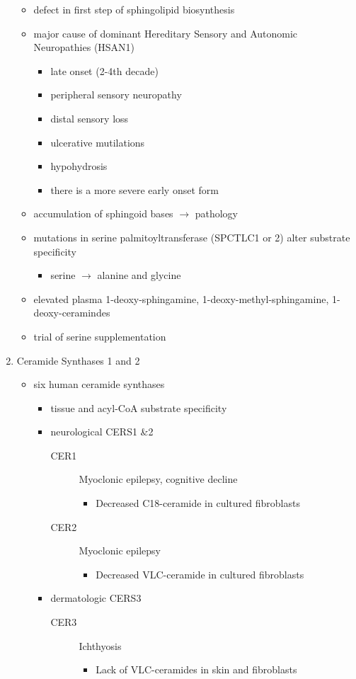 \documentclass{scrartcl}
\begin{document}
\begin{enumerate}
\begin{itemize}
\item defect in first step of sphingolipid biosynthesis
\item major cause of dominant Hereditary Sensory and Autonomic Neuropathies (HSAN1)
\begin{itemize}
\item late onset (2-4th decade)
\item peripheral sensory neuropathy
\item distal sensory loss
\item ulcerative mutilations
\item hypohydrosis
\item there is a more severe early onset form
\end{itemize}
\item accumulation of sphingoid bases \(\to\) pathology
\item mutations in serine palmitoyltransferase (SPCTLC1 or 2) alter
substrate specificity
\begin{itemize}
\item serine \(\to\) alanine and glycine
\end{itemize}
\item elevated plasma 1-deoxy-sphingamine, 1-deoxy-methyl-sphingamine, 1-deoxy-ceramindes
\item trial of serine supplementation
\end{itemize}

\item Ceramide Synthases 1 and 2
\label{sec:org6c52ac1}

\begin{itemize}
\item six human ceramide synthases
\begin{itemize}
\item tissue and acyl-CoA substrate specificity
\item neurological CERS1 \&2
\begin{description}
\item[{CER1}] Myoclonic epilepsy, cognitive decline
\begin{itemize}
\item Decreased C18-ceramide in cultured fibroblasts
\end{itemize}
\item[{CER2}] Myoclonic epilepsy
\begin{itemize}
\item Decreased VLC-ceramide in cultured fibroblasts
\end{itemize}
\end{description}
\item dermatologic CERS3
\begin{description}
\item[{CER3}] Ichthyosis
\begin{itemize}
\item Lack of VLC-ceramides in skin and fibroblasts
\end{itemize}
\end{description}
\end{itemize}
\end{itemize}


\end{enumerate}
\end{document}
